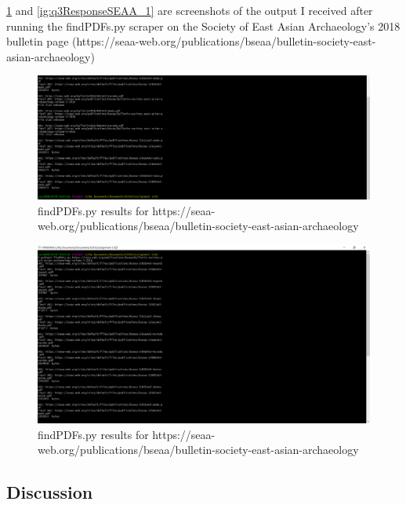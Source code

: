 \documentclass[12pt]{article}
\begin{document}
\ref{fig:q3ResponseSEAA_1} and \ref{ig:q3ResponseSEAA_1} are screenshots of the output I received after running the findPDFs.py scraper on the Society of East Asian Archaeology's 2018 bulletin page (https://seaa-web.org/publications/bseaa/bulletin-society-east-asian-archaeology)
\begin{figure}[h]
    \centering
    \includegraphics[trim=0 20 10 50, clip, width=\textwidth] {Q3/q3-seaaBulletin2016-2.png}
    \caption{findPDFs.py results for https://seaa-web.org/publications/bseaa/bulletin-society-east-asian-archaeology}
    \label{fig:q3ResponseSEAA_1}
\end{figure}


\begin{figure}[h]
    \centering
    \includegraphics[trim=0 20 10 50, clip, width=\textwidth] {Q3/q3-seaaBulletin2016.png}
    \caption{findPDFs.py results for https://seaa-web.org/publications/bseaa/bulletin-society-east-asian-archaeology}
    \label{fig:q3ResponseSEAA_2}
\end{figure}


\subsection*{Discussion}
\end{document}
